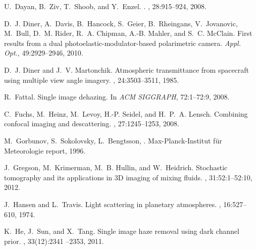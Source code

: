 \documentclass[10pt,twocolumn,letterpaper]{article}
\begin{document}
{\begin{thebibliography}{10}
   U.~{Dayan}, B.~{Ziv}, T.~{Shoob}, and Y.~{Enzel}.
    .  , 28:915--924, 2008.

   D.~J. Diner, A.~Davis, B.~Hancock, S.~Geier,
    B.~Rheingans, V.~Jovanovic, M.~Bull, D.~M. Rider, R.~A. Chipman,
    A.-B. Mahler, and S.~C. McClain.  \newblock First results from a
    dual photoelastic-modulator-based polarimetric camera.  \newblock
    {\em Appl. Opt.}, 49:2929--2946, 2010.


   D.~J. Diner and J.~V. Martonchik.  \newblock
    Atmospheric transmittance from spacecraft using multiple view
    angle imagery.  , 24:3503--3511, 1985.

   R.~Fattal.  \newblock Single image dehazing.
    \newblock In {\em ACM SIGGRAPH}, 72:1--72:9, 2008.

   C.~Fuchs, M.~Heinz, M.~Levoy, H.-P. Seidel, and
    H.~P.~A. Lensch.  \newblock Combining confocal imaging and
    descattering.  ,
    27:1245--1253, 2008.

   M.~Gorbunov, S.~Sokolovsky,
    L.~Bengtsson, %
    .  \newblock
    Max-Planck-Institut f{\"u}r Meteorologie report, 1996.

   J.~Gregson, M.~Krimerman, M.~B. Hullin, and
    W.~Heidrich.  \newblock Stochastic tomography and its applications
    in 3D imaging of mixing fluids.  ,
    31:52:1--52:10, 2012.

   J.~Hansen and L.~Travis.  \newblock Light
    scattering in planetary atmospheres.  , 16:527--610, 1974.

   K.~He, J.~Sun, and X.~Tang.  \newblock Single image
    haze removal using dark channel prior.  , 33(12):2341 --2353, 2011.


\end{thebibliography}}
\end{document}
